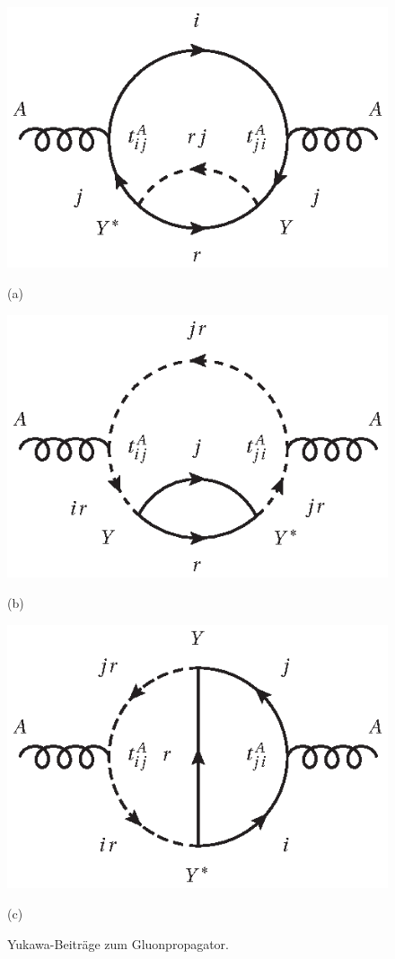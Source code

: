 \begin{figure}[h]
\begin{minipage}[t]{0.5 \textwidth}
 \includegraphics{abschnitte/beta_QCDxdQCD/fig/Yukawa1.eps}
 \caption*{(a)}
\end{minipage}
\begin{minipage}[t]{0.5\textwidth}
 \includegraphics{abschnitte/beta_QCDxdQCD/fig/Yukawa2.eps}
 \caption*{(b)}
 \end{minipage}
 \begin{minipage}[t]{0.5\textwidth}
 \includegraphics{abschnitte/beta_QCDxdQCD/fig/Yukawa3.eps}
 \caption*{(c)}
 \end{minipage}
\caption{Yukawa-Beiträge zum Gluonpropagator.}\label{fig:beta_QCDxdQCD:Yukawa}
 \end{figure}